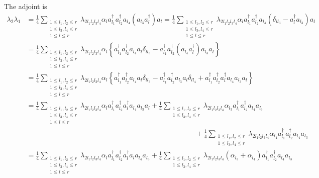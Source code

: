 \documentclass[aps,preprint]{revtex4}%
\begin{document}
The adjoint is
\begin{align}
\lambda_{2}\lambda_{1}  &  =\frac{1}{4}\sum_{\substack{1\leq l_{1},l_{2}\leq
r\\1\leq l_{3},l_{4}\leq r\\1\leq l\leq r}}\lambda_{2l_{1}l_{2}l_{3}l_{4}%
}\alpha_{l}a_{l_{1}}^{\dagger}a_{l_{2}}^{\dagger}a_{l_{4}}\left(  a_{l_{3}%
}a_{l}^{\dagger}\right)  a_{l}=\frac{1}{4}\sum_{\substack{1\leq l_{1}%
,l_{2}\leq r\\1\leq l_{3},l_{4}\leq r\\1\leq l\leq r}}\lambda_{2l_{1}%
l_{2}l_{3}l_{4}}\alpha_{l}a_{l_{1}}^{\dagger}a_{l_{2}}^{\dagger}a_{l_{4}%
}\left(  \delta_{ll_{3}}-a_{l}^{\dagger}a_{l_{3}}\right)  a_{l}\nonumber\\
&  =\frac{1}{4}\sum_{\substack{1\leq l_{1},l_{2}\leq r\\1\leq l_{3},l_{4}\leq
r\\1\leq l\leq r}}\lambda_{2l_{1}l_{2}l_{3}l_{4}}\alpha_{l}\left\{  a_{l_{1}%
}^{\dagger}a_{l_{2}}^{\dagger}a_{l_{4}}a_{l}\delta_{ll_{3}}-a_{l_{1}}%
^{\dagger}a_{l_{2}}^{\dagger}\left(  a_{l_{4}}a_{l}^{\dagger}\right)
a_{l_{3}}a_{l}\right\} \nonumber\\
&  =\frac{1}{4}\sum_{\substack{1\leq l_{1},l_{2}\leq r\\1\leq l_{3},l_{4}\leq
r\\1\leq l\leq r}}\lambda_{2l_{1}l_{2}l_{3}l_{4}}\alpha_{l}\left\{  a_{l_{1}%
}^{\dagger}a_{l_{2}}^{\dagger}a_{l_{4}}a_{l}\delta_{ll_{3}}-a_{l_{1}}%
^{\dagger}a_{l_{2}}^{\dagger}a_{l_{3}}a_{l}\delta_{ll_{4}}+a_{l_{1}}^{\dagger
}a_{l_{2}}^{\dagger}a_{l}^{\dagger}a_{l_{4}}a_{l_{3}}a_{l}\right\} \nonumber\\
&  =\frac{1}{4}\sum_{\substack{1\leq l_{1},l_{2}\leq r\\1\leq l_{3},l_{4}\leq
r\\1\leq l\leq r}}\lambda_{2l_{1}l_{2}l_{3}l_{4}}\alpha_{l}a_{l_{1}}^{\dagger
}a_{l_{2}}^{\dagger}a_{l}^{\dagger}a_{l_{4}}a_{l_{3}}a_{l}+\frac{1}{4}%
\sum_{\substack{1\leq l_{1},l_{2}\leq r\\1\leq l_{3},l_{4}\leq r}%
}\lambda_{2l_{1}l_{2}l_{3}l_{4}}\alpha_{l_{3}}a_{l_{1}}^{\dagger}a_{l_{2}%
}^{\dagger}a_{l_{4}}a_{l_{3}}\nonumber\\
&  \qquad\qquad\qquad\qquad\qquad\qquad\qquad\qquad\qquad\qquad\qquad
\qquad+\frac{1}{4}\sum_{\substack{1\leq l_{1},l_{2}\leq r\\1\leq l_{3}%
,l_{4}\leq r}}\lambda_{2l_{1}l_{2}l_{3}l_{4}}\alpha_{l_{4}}a_{l_{1}}^{\dagger
}a_{l_{2}}^{\dagger}a_{l_{4}}a_{l_{3}}\nonumber\\
&  =\frac{1}{4}\sum_{\substack{1\leq l_{1},l_{2}\leq r\\1\leq l_{3},l_{4}\leq
r\\1\leq l\leq r}}\lambda_{2l_{1}l_{2}l_{3}l_{4}}\alpha_{l}a_{l_{1}}^{\dagger
}a_{l_{2}}^{\dagger}a_{l}^{\dagger}a_{l}a_{l_{4}}a_{l_{3}}+\frac{1}{4}%
\sum_{\substack{1\leq l_{1},l_{2}\leq r\\1\leq l_{3},l_{4}\leq r}%
}\lambda_{2l_{1}l_{2}l_{3}l_{4}}\left(  \alpha_{l_{3}}+\alpha_{l_{4}}\right)
a_{l_{1}}^{\dagger}a_{l_{2}}^{\dagger}a_{l_{4}}a_{l_{3}}%
\end{align}%
\end{document}
